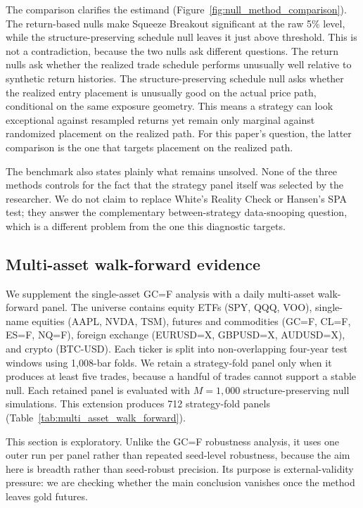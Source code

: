 \documentclass[preprint,12pt]{elsarticle}
\theoremstyle{definition}
\begin{document}
The comparison clarifies the estimand (Figure~\ref{fig:null_method_comparison}). The return-based nulls make Squeeze Breakout significant at the raw 5\% level, while the structure-preserving schedule null leaves it just above threshold. This is not a contradiction, because the two nulls ask different questions. The return nulls ask whether the realized trade schedule performs unusually well relative to synthetic return histories. The structure-preserving schedule null asks whether the realized entry placement is unusually good on the actual price path, conditional on the same exposure geometry. This means a strategy can look exceptional against resampled returns yet remain only marginal against randomized placement on the realized path. For this paper's question, the latter comparison is the one that targets placement on the realized path.

The benchmark also states plainly what remains unsolved. None of the three methods controls for the fact that the strategy panel itself was selected by the researcher. We do not claim to replace White's Reality Check or Hansen's SPA test; they answer the complementary between-strategy data-snooping question, which is a different problem from the one this diagnostic targets.

\subsection{Multi-asset walk-forward evidence}

We supplement the single-asset GC=F analysis with a daily multi-asset walk-forward panel. The universe contains equity ETFs (SPY, QQQ, VOO), single-name equities (AAPL, NVDA, TSM), futures and commodities (GC=F, CL=F, ES=F, NQ=F), foreign exchange (EURUSD=X, GBPUSD=X, AUDUSD=X), and crypto (BTC-USD). Each ticker is split into non-overlapping four-year test windows using 1{,}008-bar folds. We retain a strategy-fold panel only when it produces at least five trades, because a handful of trades cannot support a stable null. Each retained panel is evaluated with $M=1{,}000$ structure-preserving null simulations. This extension produces 712 strategy-fold panels (Table~\ref{tab:multi_asset_walk_forward}).

This section is exploratory. Unlike the GC=F robustness analysis, it uses one outer run per panel rather than repeated seed-level robustness, because the aim here is breadth rather than seed-robust precision. Its purpose is external-validity pressure: we are checking whether the main conclusion vanishes once the method leaves gold futures.
\end{document}
